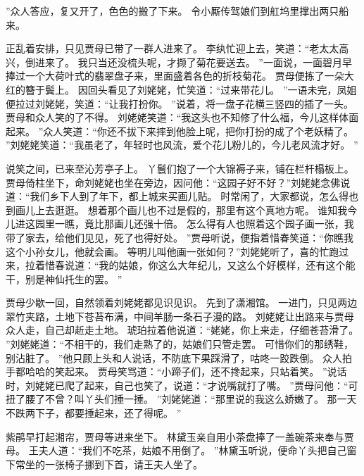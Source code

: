 ”众人答应，复又开了，色色的搬了下来。
令小厮传驾娘们到舡坞里撑出两只船来。
\par
正乱着安排，只见贾母已带了一群人进来了。
李纨忙迎上去，笑道：“老太太高兴，倒进来了。
我只当还没梳头呢，才撷了菊花要送去。
”一面说，一面碧月早捧过一个大荷叶式的翡翠盘子来，里面盛着各色的折枝菊花。
贾母便拣了一朵大红的簪于鬓上。
因回头看见了刘姥姥，忙笑道：“过来带花儿。
”一语未完，凤姐便拉过刘姥姥，笑道：“让我打扮你。
”说着，将一盘子花横三竖四的插了一头。
贾母和众人笑的了不得。
刘姥姥笑道：“我这头也不知修了什么福，今儿这样体面起来。
”众人笑道：“你还不拔下来摔到他脸上呢，把你打扮的成了个老妖精了。
”刘姥姥笑道：“我虽老了，年轻时也风流，爱个花儿粉儿的，今儿老风流才好。
”\par
说笑之间，已来至沁芳亭子上。
丫鬟们抱了一个大锦褥子来，铺在栏杆榻板上。
贾母倚柱坐下，命刘姥姥也坐在旁边，因问他：“这园子好不好？”刘姥姥念佛说道：“我们乡下人到了年下，都上城来买画儿贴。
时常闲了，大家都说，怎么得也到画儿上去逛逛。
想着那个画儿也不过是假的，那里有这个真地方呢。
谁知我今儿进这园里一瞧，竟比那画儿还强十倍。
怎么得有人也照着这个园子画一张，我带了家去，给他们见见，死了也得好处。
”贾母听说，便指着惜春笑道：“你瞧我这个小孙女儿，他就会画。
等明儿叫他画一张如何？”刘姥姥听了，喜的忙跑过来，拉着惜春说道：“我的姑娘，你这么大年纪儿，又这么个好模样，还有这个能干，别是神仙托生的罢。
”\par
贾母少歇一回，自然领着刘姥姥都见识见识。
先到了潇湘馆。
一进门，只见两边翠竹夹路，土地下苍苔布满，中间羊肠一条石子漫的路。
刘姥姥让出路来与贾母众人走，自己却赾走土地。
琥珀拉着他说道：“姥姥，你上来走，仔细苍苔滑了。
”刘姥姥道：“不相干的，我们走熟了的，姑娘们只管走罢。
可惜你们的那绣鞋，别沾脏了。
”他只顾上头和人说话，不防底下果踩滑了，咕咚一跤跌倒。
众人拍手都哈哈的笑起来。
贾母笑骂道：“小蹄子们，还不搀起来，只站着笑。
”说话时，刘姥姥已爬了起来，自己也笑了，说道：“才说嘴就打了嘴。
”贾母问他：“可扭了腰了不曾？叫丫头们捶一捶。
”刘姥姥道：“那里说的我这么娇嫩了。
那一天不跌两下子，都要捶起来，还了得呢。
”\par
紫鹃早打起湘帘，贾母等进来坐下。
林黛玉亲自用小茶盘捧了一盖碗茶来奉与贾母。
王夫人道：“我们不吃茶，姑娘不用倒了。
”林黛玉听说，便命丫头把自己窗下常坐的一张椅子挪到下首，请王夫人坐了。
